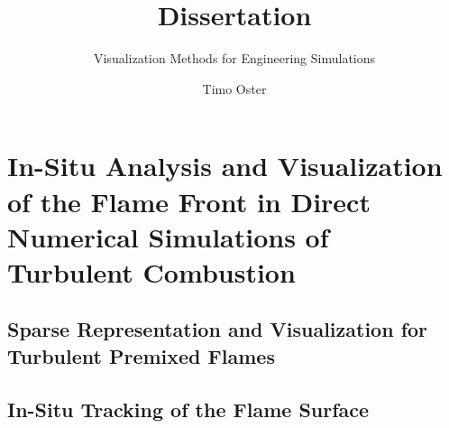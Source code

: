 \documentclass[BCOR=15mm, DIV=8]{scrbook}
\title{ Dissertation }
\subtitle{ Visualization Methods for Engineering Simulations }
\author{ Timo Oster }
\begin{document}

\frontmatter

\maketitle

\tableofcontents

\mainmatter





\part[In-Situ Analysis and Visualization of Turbulent Combustion Simulations]
        {In-Situ Analysis and Visualization of the Flame Front
         in Direct Numerical Simulations of Turbulent Combustion} %
\label{part:on_the_fly}



\chapter[Sparse Representation for Turbulent Premixed Flames]
        {Sparse Representation and Visualization for Turbulent Premixed Flames} %
\label{cha:sparse_representation}
%
\tikzset{external/export=false}
\tikzset{external/export=true}
%







%

\chapter{In-Situ Tracking of the Flame Surface} %
\label{cha:flame_surface_tracking}
%
\tikzset{external/export=false}
\tikzset{external/export=true}
%






%
\end{document}
